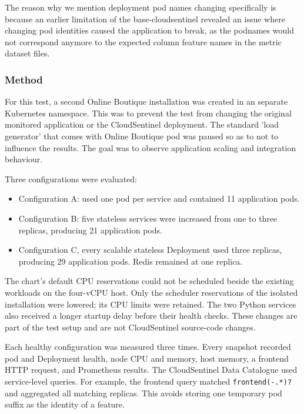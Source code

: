 The reason why we mention deployment pod names changing specifically is because an earlier limitation of the base-cloudsentinel revealed an issue where changing pod identities caused the application to break, as the podnames would not correspond anymore to the expected column feature names in the metric dataset files.

\subsubsection{Method}

For this test, a second Online Boutique installation was created in an separate Kubernetes namespace. This was to prevent the test from changing the original monitored application or the CloudSentinel deployment. The standard 'load generator' that comes with Online Boutique pod was paused so as to not to influence the results. The goal was to observe application scaling and integration behaviour.

Three configurations were evaluated:

\begin{itemize}
    \item Configuration A: used one pod per service and contained 11 application pods.
    \item Configuration B: five stateless services were increased from one to three replicas, producing 21 application pods.
    \item Configuration C, every scalable stateless Deployment used three replicas, producing 29 application pods. Redis remained at one replica.
\end{itemize}

The chart's default CPU reservations could not be scheduled beside the existing workloads on the four-vCPU host. Only the scheduler reservations of the isolated installation were lowered; its CPU limits were retained. The two Python services also received a longer startup delay before their health checks. These changes are part of the test setup and are not CloudSentinel source-code changes.

Each healthy configuration was measured three times. Every snapshot recorded pod and Deployment health, node CPU and memory, host memory, a frontend HTTP request, and Prometheus results. The CloudSentinel Data Catalogue used service-level queries. For example, the frontend query matched \texttt{frontend(-.*)?} and aggregated all matching replicas. This avoids storing one temporary pod suffix as the identity of a feature.


